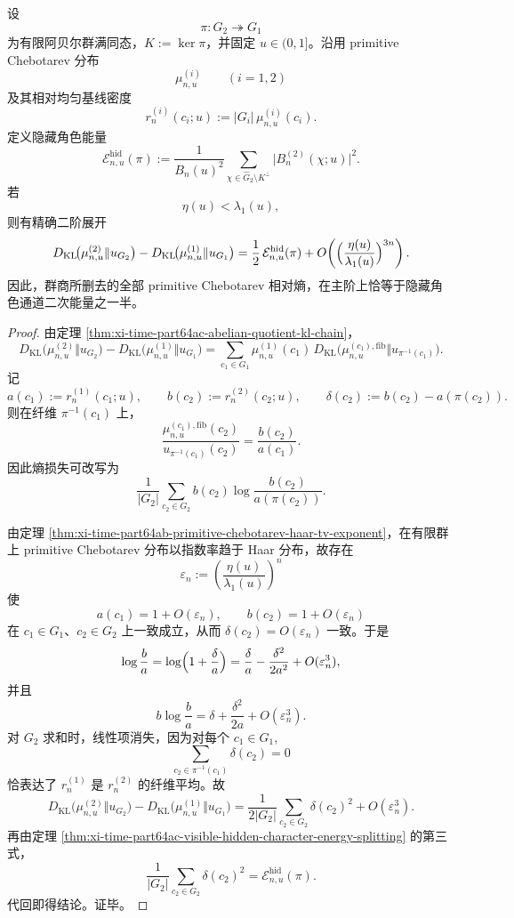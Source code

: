 \begin{theorem}\label{thm:conclusion-chebotarev-hiddenchannel-kl-second-order}
设
\[
\pi:G_2\twoheadrightarrow G_1
\]
为有限阿贝尔群满同态，\(K:=\ker\pi\)，并固定 \(u\in(0,1]\)。沿用 primitive Chebotarev 分布
\[
\mu_{n,u}^{(i)}\qquad (i=1,2)
\]
及其相对均匀基线密度
\[
r_n^{(i)}(c_i;u):=|G_i|\,\mu_{n,u}^{(i)}(c_i).
\]
定义隐藏角色能量
\[
\mathcal E_{n,u}^{\mathrm{hid}}(\pi)
:=
\frac{1}{B_n(u)^2}
\sum_{\chi\in \widehat G_2\setminus K^\perp}
\bigl|B_n^{(2)}(\chi;u)\bigr|^2.
\]
若
\[
\eta(u)<\lambda_1(u),
\]
则有精确二阶展开
\[
D_{\mathrm{KL}}\!\bigl(\mu_{n,u}^{(2)}\Vert u_{G_2}\bigr)
-
D_{\mathrm{KL}}\!\bigl(\mu_{n,u}^{(1)}\Vert u_{G_1}\bigr)
=
\frac12\,\mathcal E_{n,u}^{\mathrm{hid}}(\pi)
+
O\!\left(\Bigl(\frac{\eta(u)}{\lambda_1(u)}\Bigr)^{3n}\right).
\]
因此，群商所删去的全部 primitive Chebotarev 相对熵，在主阶上恰等于隐藏角色通道二次能量之一半。
\end{theorem}
\begin{proof}
由定理 \ref{thm:xi-time-part64ac-abelian-quotient-kl-chain}，
\[
D_{\mathrm{KL}}\!\bigl(\mu_{n,u}^{(2)}\Vert u_{G_2}\bigr)
-
D_{\mathrm{KL}}\!\bigl(\mu_{n,u}^{(1)}\Vert u_{G_1}\bigr)
=
\sum_{c_1\in G_1}
\mu_{n,u}^{(1)}(c_1)\,
D_{\mathrm{KL}}\!\bigl(\mu_{n,u}^{(c_1),\mathrm{fib}}\Vert u_{\pi^{-1}(c_1)}\bigr).
\]
记
\[
a(c_1):=r_n^{(1)}(c_1;u),
\qquad
b(c_2):=r_n^{(2)}(c_2;u),
\qquad
\delta(c_2):=b(c_2)-a(\pi(c_2)).
\]
则在纤维 \(\pi^{-1}(c_1)\) 上，
\[
\frac{\mu_{n,u}^{(c_1),\mathrm{fib}}(c_2)}{u_{\pi^{-1}(c_1)}(c_2)}
=
\frac{b(c_2)}{a(c_1)}.
\]
因此熵损失可改写为
\[
\frac{1}{|G_2|}\sum_{c_2\in G_2}
b(c_2)\log\frac{b(c_2)}{a(\pi(c_2))}.
\]

由定理 \ref{thm:xi-time-part64ab-primitive-chebotarev-haar-tv-exponent}，在有限群上 primitive Chebotarev 分布以指数率趋于 Haar 分布，故存在
\[
\varepsilon_n:=\left(\frac{\eta(u)}{\lambda_1(u)}\right)^n
\]
使
\[
a(c_1)=1+O(\varepsilon_n),
\qquad
b(c_2)=1+O(\varepsilon_n)
\]
在 \(c_1\in G_1\)、\(c_2\in G_2\) 上一致成立，从而 \(\delta(c_2)=O(\varepsilon_n)\) 一致。于是
\[
\log\frac{b}{a}
=
\log\Bigl(1+\frac{\delta}{a}\Bigr)
=
\frac{\delta}{a}-\frac{\delta^2}{2a^2}+O(\varepsilon_n^3),
\]
并且
\[
b\log\frac{b}{a}
=
\delta+\frac{\delta^2}{2a}+O(\varepsilon_n^3).
\]
对 \(G_2\) 求和时，线性项消失，因为对每个 \(c_1\in G_1\),
\[
\sum_{c_2\in\pi^{-1}(c_1)}\delta(c_2)=0
\]
恰表达了 \(r_n^{(1)}\) 是 \(r_n^{(2)}\) 的纤维平均。故
\[
D_{\mathrm{KL}}\!\bigl(\mu_{n,u}^{(2)}\Vert u_{G_2}\bigr)
-
D_{\mathrm{KL}}\!\bigl(\mu_{n,u}^{(1)}\Vert u_{G_1}\bigr)
=
\frac{1}{2|G_2|}\sum_{c_2\in G_2}\delta(c_2)^2
+
O(\varepsilon_n^3).
\]
再由定理 \ref{thm:xi-time-part64ac-visible-hidden-character-energy-splitting} 的第三式，
\[
\frac{1}{|G_2|}\sum_{c_2\in G_2}\delta(c_2)^2
=
\mathcal E_{n,u}^{\mathrm{hid}}(\pi).
\]
代回即得结论。证毕。
\end{proof}

